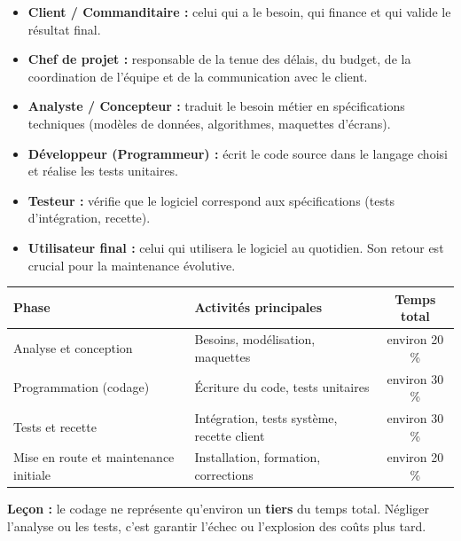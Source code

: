 \documentclass[11pt]{article}
\begin{document}
\begin{definition}
\begin{itemize}
    \item \textbf{Client / Commanditaire :} celui qui a le besoin, qui finance et qui valide le résultat final.
    \item \textbf{Chef de projet :} responsable de la tenue des délais, du budget, de la coordination de l'équipe et de la communication avec le client.
    \item \textbf{Analyste / Concepteur :} traduit le besoin métier en spécifications techniques (modèles de données, algorithmes, maquettes d'écrans).
    \item \textbf{Développeur (Programmeur) :} écrit le code source dans le langage choisi et réalise les tests unitaires.
    \item \textbf{Testeur :} vérifie que le logiciel correspond aux spécifications (tests d'intégration, recette).
    \item \textbf{Utilisateur final :} celui qui utilisera le logiciel au quotidien. Son retour est crucial pour la maintenance évolutive.
\end{itemize}
\end{definition}

\begin{exemplebox}
\begin{center}
\begin{tabularx}{\linewidth}{|l|X|c|}
\hline
\rowcolor{popblueL}
\textbf{Phase} & \textbf{Activités principales} & \textbf{Temps total} \\ \hline
Analyse et conception & Besoins, modélisation, maquettes & environ 20 \% \\ \hline
Programmation (codage) & Écriture du code, tests unitaires & environ 30 \% \\ \hline
Tests et recette & Intégration, tests système, recette client & environ 30 \% \\ \hline
Mise en route et maintenance initiale & Installation, formation, corrections & environ 20 \% \\ \hline
\end{tabularx}
\end{center}
\textbf{Leçon :} le codage ne représente qu'environ un \textbf{tiers} du temps total. Négliger l'analyse ou les tests, c'est garantir l'échec ou l'explosion des coûts plus tard.
\end{exemplebox}
\end{document}
